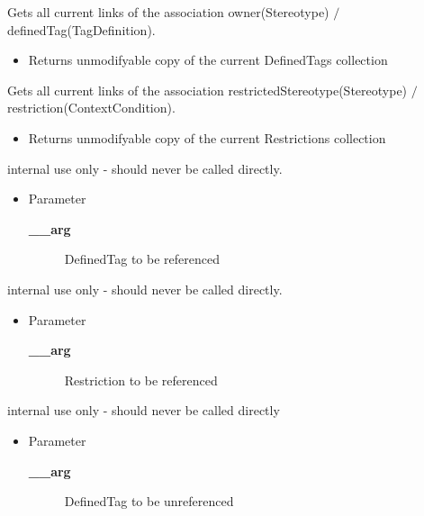 \begin{desc}Gets all current links of the association owner(Stereotype)
 $/$ definedTag(TagDefinition).
\begin{itemize}
\item{Returns unmodifyable copy of the current DefinedTags collection }
\end{itemize}
\end{desc}

\begin{desc}Gets all current links of the association restrictedStereotype(Stereotype)
 $/$ restriction(ContextCondition).
\begin{itemize}
\item{Returns unmodifyable copy of the current Restrictions collection }
\end{itemize}
\end{desc}

\begin{desc}internal use only - should never be called directly.
\begin{itemize}
\item{Parameter
  \begin{description}
   \item[{\bf \_\_arg}]{DefinedTag to be referenced}
  \end{description}}
\end{itemize}
\end{desc}

\begin{desc}internal use only - should never be called directly.
\begin{itemize}
\item{Parameter
  \begin{description}
   \item[{\bf \_\_arg}]{Restriction to be referenced}
  \end{description}}
\end{itemize}
\end{desc}

\begin{desc}internal use only - should never be called directly
\begin{itemize}
\item{Parameter
  \begin{description}
   \item[{\bf \_\_arg}]{DefinedTag to be unreferenced}
  \end{description}}
\end{itemize}
\end{desc}

